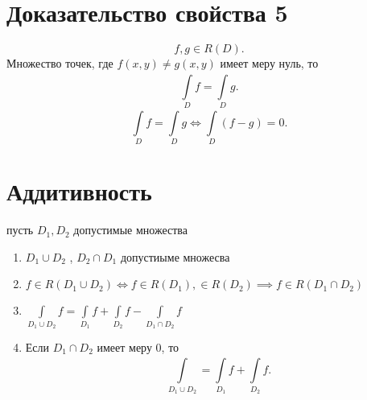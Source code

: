 \documentclass[14pt]{extarticle} \usepackage{fontspec}
\begin{document}
    \section{Доказательство свойства 5}
    \[
    f,g \in R(D)
    .\] 
    Множество точек, где $f(x,y) \neq g(x,y)$ имеет меру нуль, то 
    \[
    \int\limits_{D}^{} f = \int\limits_{D}^{} g  
    .\] 
    \[
        \int\limits_{D}^{} f = \int\limits_{D}^{} g \iff \int\limits_{D}^{} (f - g)  =0
    .\] 
    \section{Аддитивность}
    пусть $D_1,D_2$ допустимые множества
    \begin{enumerate}
        \item $D_1 \cup D_2$ , $D_2 \cap D_1$ допустиыме множесва
        \item $f \in R(D_1 \cup D_2) \iff f \in R(D_1) , \in R(D_2) \implies f \in R(D_1 \cap D_2)$
        \item $\int\limits_{D_1 \cup D_2}^{} f = \int\limits_{D_1}^{} f + \int\limits_{D_2}^{} f - \int\limits_{D_1 \cap D_2}^{} f      $ 
        \item Если $D_1 \cap D_2$ имеет меру 0, то 
            \[
            \int\limits_{D_1 \cup D_2}^{}   = \int\limits_{D_1}^{} f + \int\limits_{D_2}^{}  f
            .\] 
    \end{enumerate}
\end{document}
